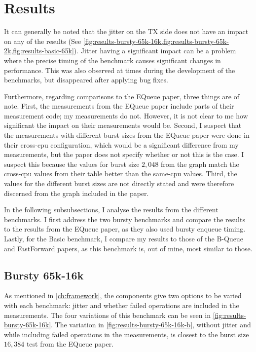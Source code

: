 \section{Results}
It can generally be noted that the jitter on the TX side does not have an impact on any of the results
(See \cref{fig:results-bursty-65k-16k,fig:results-bursty-65k-2k,fig:results-basic-65k}).
Jitter having a significant impact can be a problem where the precise timing of the benchmark causes
significant changes in performance.
This was also observed at times during the development of the benchmarks, but disappeared after applying bug fixes.

Furthermore, regarding comparisons to the EQueue paper, three things are of note.
First, the measurements from the EQueue paper include parts of their measurement code; my measurements do
not\cite{EQueueGithub}.
However, it is not clear to me how significant the impact on their measurements would be.
Second, I suspect that the measurements with different burst sizes from the EQueue paper were done in their
cross-cpu configuration, which would be a significant difference from my measurements, but the paper does not
specify whether or not this is the case.
I suspect this because the values for burst size $2,048$ from the graph match the cross-cpu values from their
table better than the same-cpu values.
Third, the values for the different burst sizes are not directly stated and were therefore discerned from the
graph included in the paper.

In the following subsubsections, I analyse the results from the different benchmarks.
I first address the two bursty benchmarks and compare the results to the results from the EQueue paper, as
they also used bursty enqueue timing.
Lastly, for the Basic benchmark, I compare my results to those of the B-Queue and FastForward papers, as this
benchmark is, out of mine, most similar to those.

\subsection{Bursty 65k-16k}

As mentioned in \autoref{ch:framework}, the components give two options to be varied with each benchmark:
jitter and whether failed operations are included in the measurements.
The four variations of this benchmark can be seen in \autoref{fig:results-bursty-65k-16k}.
The variation in \autoref{fig:results-bursty-65k-16k-b}, without jitter and while including failed operations
in the measurements, is closest to the burst size $16,384$ test from the EQueue paper\cite{EQueue}.

